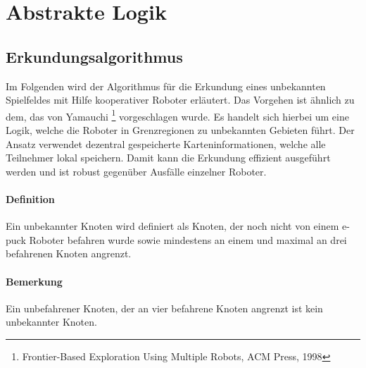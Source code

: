 \documentclass[10pt,a4paper]{article}
\let\oldsection\section
\renewcommand{\section}{\newpage \oldsection}
\begin{document}
	\section{Abstrakte Logik}
		\subsection{Erkundungsalgorithmus}
			Im Folgenden wird der Algorithmus für die Erkundung eines unbekannten Spielfeldes mit Hilfe kooperativer Roboter erläutert. Das
			Vorgehen ist ähnlich zu dem, das von Yamauchi	\footnote{Frontier-Based Exploration Using Multiple Robots, ACM Press, 1998}
			vorgeschlagen wurde. Es handelt sich hierbei um eine Logik, welche die Roboter in Grenzregionen zu unbekannten Gebieten führt.
			Der Ansatz verwendet dezentral gespeicherte Karteninformationen, welche alle Teilnehmer lokal speichern. Damit
			kann die Erkundung effizient ausgeführt werden und ist robust gegenüber Ausfälle einzelner Roboter.
			\paragraph*{Definition} Ein unbekannter Knoten wird definiert als Knoten, der noch nicht von einem e-puck Roboter befahren wurde
				sowie mindestens an einem und maximal an drei befahrenen Knoten angrenzt.
			\paragraph*{Bemerkung} Ein unbefahrener Knoten, der an vier befahrene Knoten angrenzt ist kein unbekannter Knoten.
\end{document}
